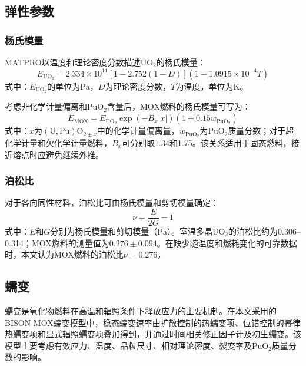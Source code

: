 \subsection{弹性参数}

\subsubsection{杨氏模量}

MATPRO以温度和理论密度分数描述$\mathrm{UO}_2$的杨氏模量：
\begin{equation}
	E_{\mathrm{UO}_2}
	=2.334\times10^{11}
	\left[1-2.752(1-D)\right]
	\left(1-1.0915\times10^{-4}T\right)
	\label{eq:uo2_youngs_modulus}
\end{equation}
\noindent 式中：$E_{\mathrm{UO}_2}$的单位为$\mathrm{Pa}$，$D$为理论密度分数，$T$为温度，单位为$\mathrm{K}$。

考虑非化学计量偏离和$\mathrm{PuO}_2$含量后，MOX燃料的杨氏模量可写为：
\begin{equation}
	E_{\mathrm{MOX}}
	=E_{\mathrm{UO}_2}\exp(-B_x|x|)
	\left(1+0.15w_{\mathrm{PuO}_2}\right)
	\label{eq:mox_youngs_modulus}
\end{equation}
\noindent 式中：$x$为$(\mathrm{U},\mathrm{Pu})\mathrm{O}_{2\pm x}$中的化学计量偏离量，$w_{\mathrm{PuO}_2}$为$\mathrm{PuO}_2$质量分数；对于超化学计量和欠化学计量燃料，$B_x$可分别取1.34和1.75。该关系适用于固态燃料，接近熔点时应避免继续外推。

\subsubsection{泊松比}

对于各向同性材料，泊松比可由杨氏模量和剪切模量确定：
\begin{equation}
	\nu=\frac{E}{2G}-1
	\label{eq:mox_poisson_ratio}
\end{equation}
\noindent 式中：$E$和$G$分别为杨氏模量和剪切模量（$\mathrm{Pa}$）。室温多晶$\mathrm{UO}_2$的泊松比约为0.306--0.314；MOX燃料的测量值为$0.276\pm0.094$。在缺少随温度和燃耗变化的可靠数据时，本文认为MOX燃料的泊松比$\nu=0.276$。

\subsection{蠕变}

蠕变是氧化物燃料在高温和辐照条件下释放应力的主要机制。在本文采用的BISON MOX蠕变模型中，稳态蠕变速率由扩散控制的热蠕变项、位错控制的幂律热蠕变项和显式辐照蠕变项叠加得到，并通过时间相关修正因子计及初生蠕变。该模型主要考虑有效应力、温度、晶粒尺寸、相对理论密度、裂变率及$\mathrm{PuO}_2$质量分数的影响。

